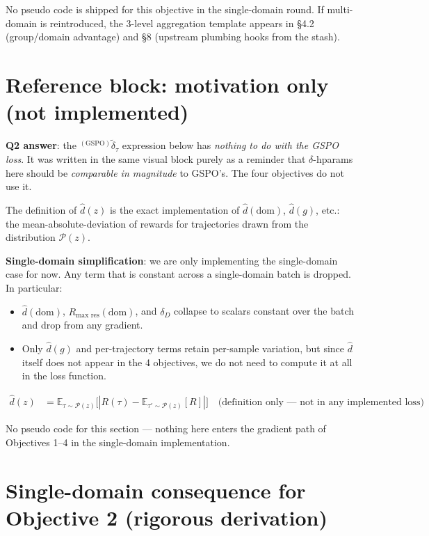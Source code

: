 \documentclass{article}
\begin{document}
No pseudo code is shipped for this objective in the single-domain
round. If multi-domain is reintroduced, the 3-level aggregation
template appears in \S4.2 (group/domain advantage) and \S8 (upstream
plumbing hooks from the stash).

\section{Reference block: motivation only (not implemented)}

\textbf{Q2 answer}: the ${}^{(\text{GSPO})}\tilde\delta_\tau$ expression
below has \emph{nothing to do with the GSPO loss}. It was written in the
same visual block purely as a reminder that $\delta$-hparams here should
be \emph{comparable in magnitude} to GSPO's. The four objectives do not
use it.

The definition of $\hat d(z)$ is the exact implementation of $\hat d(\text{dom})$,
$\hat d(g)$, etc.: the mean-absolute-deviation of rewards for
trajectories drawn from the distribution $\mathcal{P}(z)$.

\textbf{Single-domain simplification}: we are only implementing the
single-domain case for now. Any term that is constant across a
single-domain batch is dropped. In particular:

\begin{itemize}
\item $\hat d(\text{dom})$, $R_{\text{max res}}(\text{dom})$, and
  $\delta_D$ collapse to scalars constant over the batch and drop from
  any gradient.
\item Only $\hat d(g)$ and per-trajectory terms retain per-sample
  variation, but since $\hat d$ itself does not appear in the 4
  objectives, we do not need to compute it at all in the loss function.
\end{itemize}

\begin{align*}
\hat d(z) &= \mathbb{E}_{\tau \sim \mathcal{P}(z)}\bigl[ |R(\tau) - \mathbb{E}_{\tau'\sim\mathcal{P}(z)}[R]| \bigr]
             \quad \text{(definition only --- not in any implemented loss)}
\end{align*}

No pseudo code for this section --- nothing here enters the gradient
path of Objectives 1--4 in the single-domain implementation.

\section{Single-domain consequence for Objective 2 (rigorous derivation)}
\end{document}
